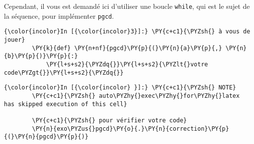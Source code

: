 Cependant, il vous est demandé ici d'utiliser une boucle \texttt{while},
qui est le sujet de la séquence, pour implémenter \texttt{pgcd}.

    \begin{Verbatim}[commandchars=\\\{\}]
{\color{incolor}In [{\color{incolor}3}]:} \PY{c+c1}{\PYZsh{} à vous de jouer}
        \PY{k}{def} \PY{n+nf}{pgcd}\PY{p}{(}\PY{n}{a}\PY{p}{,} \PY{n}{b}\PY{p}{)}\PY{p}{:}
            \PY{l+s+s2}{\PYZdq{}}\PY{l+s+s2}{\PYZlt{}votre code\PYZgt{}}\PY{l+s+s2}{\PYZdq{}}
\end{Verbatim}


    \begin{Verbatim}[commandchars=\\\{\}]
{\color{incolor}In [{\color{incolor} }]:} \PY{c+c1}{\PYZsh{} NOTE}
        \PY{c+c1}{\PYZsh{} auto\PYZhy{}exec\PYZhy{}for\PYZhy{}latex has skipped execution of this cell}
        
        \PY{c+c1}{\PYZsh{} pour vérifier votre code}
        \PY{n}{exo\PYZus{}pgcd}\PY{o}{.}\PY{n}{correction}\PY{p}{(}\PY{n}{pgcd}\PY{p}{)}
\end{Verbatim}



    
    
    
